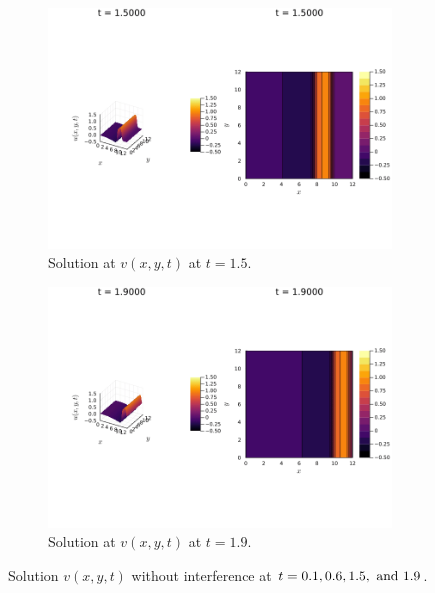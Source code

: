 \documentclass[12pt]{report}
\begin{document}
\begin{solution}
\begin{figure}[H]
\begin{subfigure}[b]{0.45\linewidth}
        \centering
        \includegraphics[width=\linewidth]{images/6-1-150.png}
        \caption{Solution at $v(x,y,t)$ at $t=1.5$.}
        \label{6-1:c}
        \vspace{4ex}
    \end{subfigure}%
    \begin{subfigure}[b]{0.45\linewidth}
        \centering
        \includegraphics[width=\linewidth]{images/6-1-190.png}
        \caption{Solution at $v(x,y,t)$ at $t=1.9$.}
        \label{6-1:d}
        \vspace{4ex}
    \end{subfigure}
    \caption{Solution $v(x,y,t)$ without interference at $t=0.1,0.6,1.5,{~\text{and}~} 1.9$. }
    \label{6-1}
\end{figure}


\end{solution}
\end{document}

